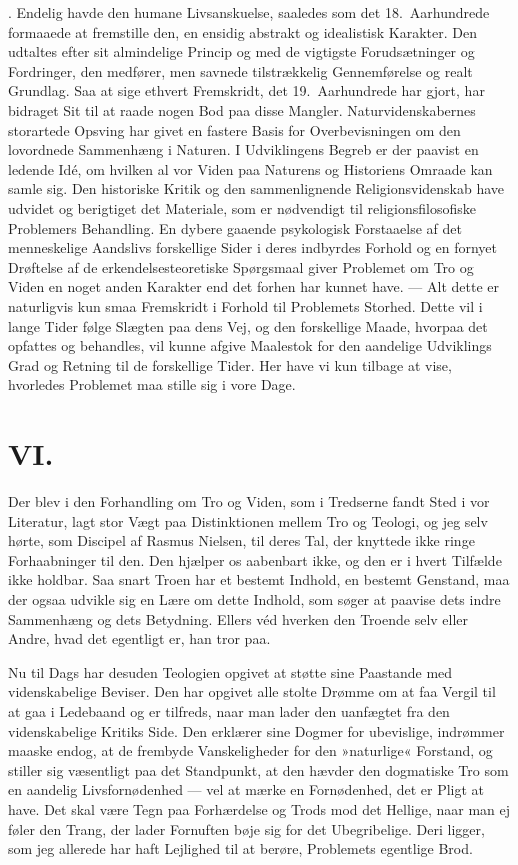 \documentclass[12pt,a4paper]{article}
\newcommand{\apage}[1]{\marginnote{\footnotesize\textit{[#1]}}}
\begin{document}
\medskip
{}. Endelig havde den humane Livsanskuelse, saaledes som det 18.\ Aarhundrede
formaaede at fremstille den, en ensidig abstrakt og idealistisk Karakter. Den udtaltes efter
sit almindelige Princip og med de vigtigste Forudsætninger og Fordringer, den medfører, \apage{209} men
savnede tilstrækkelig Gennemførelse og realt Grundlag. Saa at sige ethvert Fremskridt, det
19.\ Aarhundrede har gjort, har bidraget Sit til at raade nogen Bod paa disse Mangler.
Naturvidenskabernes storartede Opsving har givet en fastere Basis for Overbevisningen om den
lovordnede Sammenhæng i Naturen. I Udviklingens Begreb er der paavist en ledende Idé, om
hvilken al vor Viden paa Naturens og Historiens Omraade kan samle sig. Den historiske Kritik
og den sammenlignende Religionsvidenskab have udvidet og berigtiget det Materiale, som er
nødvendigt til religionsfilosofiske Problemers Behandling. En dybere gaaende psykologisk
Forstaaelse af det menneskelige Aandslivs forskellige Sider i deres indbyrdes Forhold og en
fornyet Drøftelse af de erkendelsesteoretiske Spørgsmaal giver Problemet om Tro og Viden en
noget anden Karakter end det forhen har kunnet have. --- Alt dette er naturligvis kun smaa
Fremskridt i Forhold til Problemets Storhed. Dette vil i lange Tider følge Slægten paa dens
Vej, og den forskellige Maade, hvorpaa det opfattes og behandles, vil kunne afgive Maalestok
for den aandelige Udviklings Grad og Retning til de forskellige Tider. Her have vi kun tilbage
at vise, hvorledes Problemet maa stille sig i vore Dage.

\section*{VI.}

Der blev i den Forhandling om Tro og Viden, som i Tredserne fandt Sted i vor
Literatur, lagt stor Vægt paa Distinktionen mellem Tro og Teologi, og jeg selv
hørte, som Discipel af Rasmus Nielsen, til deres Tal, der knyttede ikke ringe
Forhaabninger til den. Den hjælper os aabenbart ikke, og den er i hvert Tilfælde
ikke holdbar. Saa snart Troen har et bestemt Indhold, en bestemt Genstand, maa
der ogsaa udvikle sig en Lære om dette Indhold, som søger at paavise dets indre
Sammenhæng og dets Betydning. Ellers véd hverken den Troende selv eller Andre,
hvad det egentligt er, han tror paa.

Nu til Dags har desuden Teologien opgivet at støtte sine Paastande med
videnskabelige Beviser. Den har opgivet \apage{210} alle stolte Drømme om at faa Vergil til
at gaa i Ledebaand og er tilfreds, naar man lader den uanfægtet fra den
videnskabelige Kritiks Side. Den erklærer sine Dogmer for ubevislige, indrømmer
maaske endog, at de frembyde Vanskeligheder for den »naturlige« Forstand, og
stiller sig væsentligt paa det Standpunkt, at den hævder den dogmatiske Tro som
en aandelig Livsfornødenhed --- vel at mærke en Fornødenhed, det er Pligt at
have. Det skal være Tegn paa Forhærdelse og Trods mod det Hellige, naar man ej
føler den Trang, der lader Fornuften bøje sig for det Ubegribelige. Deri ligger,
som jeg allerede har haft Lejlighed til at berøre, Problemets egentlige Brod.
\end{document}
